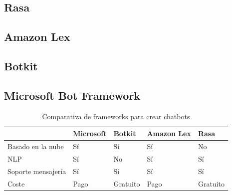 \subsection{Rasa}


\subsection{Amazon Lex}

\subsection{Botkit}

\subsection{Microsoft Bot Framework}

\begin{table}[htbp]
\centering
\begin{tabular}{|l|l|l|l|l|} 
\hline
                   & Microsoft & Botkit   & Amazon Lex & Rasa      \\ 
\hline
Basado en la nube  & Sí        & Sí       & Sí         & No        \\ 
\hline
NLP                & Sí        & No       & Sí         & Sí        \\ 
\hline
Soporte mensajería & Sí        & Sí       & Sí         & Sí        \\ 
\hline
Coste              & Pago      & Gratuito & Pago       & Gratuito  \\
\hline
\end{tabular}
\caption{Comparativa de frameworks para crear chatbots}
\end{table}


